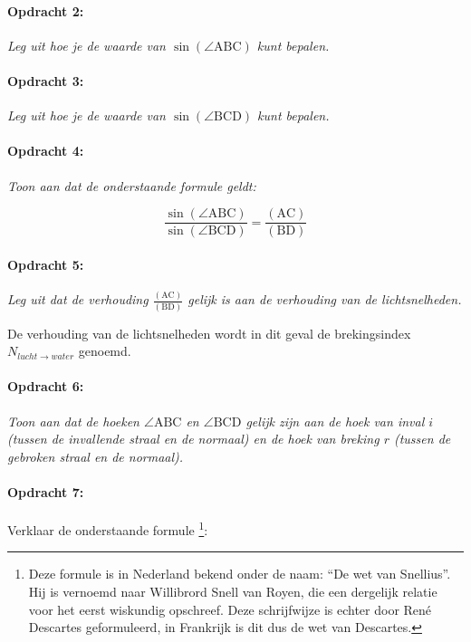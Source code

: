 \paragraph*{Opdracht 2:}

\emph{Leg uit hoe je de waarde van $\sin(\angle\mathrm{ABC})$ kunt
bepalen.}


\paragraph*{Opdracht 3:}

\emph{Leg uit hoe je de waarde van $\sin(\angle\mathrm{BCD})$ kunt
bepalen.}


\paragraph*{Opdracht 4:}

\emph{Toon aan dat de onderstaande formule geldt:}

\[
\frac{\sin(\angle\mathrm{ABC})}{\sin(\angle\mathrm{BCD})}
=\frac{(\mathrm{AC})}{(\mathrm{BD})}
\]


\paragraph*{Opdracht 5:}

\emph{Leg uit dat de verhouding $\frac{(\mathrm{AC})}{(\mathrm{BD})}$
gelijk is aan de verhouding van de lichtsnelheden.}

De verhouding van de lichtsnelheden wordt in dit geval de brekingsindex
$N_{lucht\rightarrow water}$ genoemd.


\paragraph*{Opdracht 6:}

\emph{Toon aan dat de hoeken $\angle\mathrm{ABC}$ en $\angle\mathrm{BCD}$
gelijk zijn aan de hoek van inval $i$ (tussen de invallende straal
en de normaal) en de hoek van breking $r$ (tussen de gebroken straal
en de normaal).}


\paragraph*{Opdracht 7:}

Verklaar de onderstaande formule \footnote{Deze formule is in Nederland
bekend onder de naam: ``De wet van Snellius''. Hij is vernoemd naar
Willibrord Snell van Royen, die een dergelijk relatie voor het eerst
wiskundig opschreef. Deze schrijfwijze is echter door René Descartes
geformuleerd, in Frankrijk is dit dus de wet van Descartes.}:

